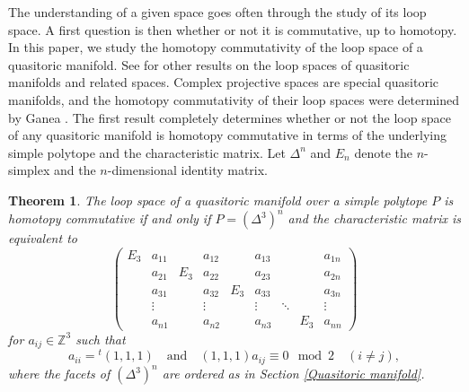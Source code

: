 \documentclass[a4paper]{amsart}
\numberwithin{equation}{section}
\newtheorem{theorem}{Theorem}[section]
\theoremstyle{definition}
\theoremstyle{remark}
\numberwithin{equation}{section}
\newcommand{\Z}{\mathbb{Z}}
\begin{document}
The understanding of a given space goes often through the study of its loop space. A first question is then whether or not it is commutative, up to homotopy. In this paper, we study the homotopy commutativity of the loop space of a quasitoric manifold. See \cite{A,AP,D1,D2,GPTW,IK2,IK3,KMY,Z} for other results on the loop spaces of quasitoric manifolds and related spaces. Complex projective spaces are special quasitoric manifolds, and the homotopy commutativity of their loop spaces were determined by Ganea \cite{G}. The first result completely determines whether or not the loop space of any quasitoric manifold is homotopy commutative in terms of the underlying simple polytope and the characteristic matrix. Let $\Delta^n$ and $E_n$ denote the $n$-simplex and the $n$-dimensional identity matrix.






\begin{theorem}
  \label{main}
  The loop space of a quasitoric manifold over a simple polytope $P$ is homotopy commutative if and only if $P=(\Delta^3)^n$ and the characteristic matrix is equivalent to
  \begin{equation}
    \label{main matrix}
    \begin{pmatrix}
      E_3&a_{11}&&a_{12}&&a_{13}&&&a_{1n}\\
      &a_{21}&E_3&a_{22}&&a_{23}&&&a_{2n}\\
      &a_{31}&&a_{32}&E_3&a_{33}&&&a_{3n}\\
      &\vdots&&\vdots&&\vdots&\ddots&&\vdots\\
      &a_{n1}&&a_{n2}&&a_{n3}&&E_3&a_{nn}
    \end{pmatrix}
  \end{equation}
  for $a_{ij}\in\Z^3$ such that
  \begin{equation}
    \label{main condition}
    a_{ii}={}^t(1,1,1)\quad\text{and}\quad(1,1,1)a_{ij}\equiv 0\mod 2\quad(i\ne j),
  \end{equation}
  where the facets of $(\Delta^3)^n$ are ordered as in Section \ref{Quasitoric manifold}.
\end{theorem}
\end{document}
